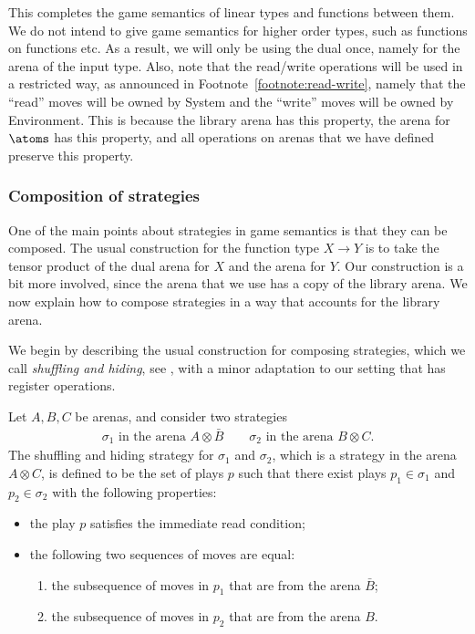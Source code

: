 This completes the game semantics of linear types and functions between them. We do not intend to give game semantics for higher order types, such as functions on functions etc. As a result, we will only be using the dual once, namely for the arena of the input type. Also, note that the read/write operations will be used in a restricted way, as announced in Footnote~\ref{footnote:read-write}, namely that the ``read'' moves will be owned by System and the ``write'' moves will be owned by Environment.  This is because the library arena has this property, the arena for $\atoms$ has this property, and all operations on arenas that we have defined preserve this property.

\subsubsection{Composition of strategies}
\label{sec:composition-of-strategies}
One of the main points about strategies in game semantics is that they can be composed.
The usual construction for the function type $X \to Y$ is to take the tensor product of the dual arena for $X$ and the arena for $Y$. 
Our construction is a bit more involved, since the arena that we use has a copy of the library arena. We now explain how to compose strategies in a way that accounts for the library arena. 

We begin by describing the usual construction for composing strategies, which we call \emph{shuffling and hiding}, see \cite[p.12]{abramsky2013semantics}, with a minor adaptation to our setting that has register operations. 

\begin{definition}\label{def:shuffling-and-hiding}
    Let $A, B, C$ be arenas, and consider two strategies
    \begin{align*}
    \sigma_1 \text{ in the arena $A \otimes \bar B$}
    \qquad
    \sigma_2 \text{ in the arena $B \otimes C$}.
    \end{align*}
    The shuffling and hiding strategy for  $\sigma_1$ and $\sigma_2$, which is a strategy  in the  arena $A \otimes C$, is defined to be the set of plays    $p$  such that there exist plays $p_1 \in \sigma_1$ and  $p_2 \in \sigma_2$  with the following properties: 
\begin{itemize}
    \item the play $p$ satisfies the immediate read condition;
    \item the following two sequences of moves are equal: 
    \begin{enumerate}
        \item the subsequence of moves in $p_1$ that are from the arena $\bar B$;
        \item the subsequence of moves in $p_2$ that are from the arena $B$.
    \end{enumerate}
\end{itemize}
\end{definition}

